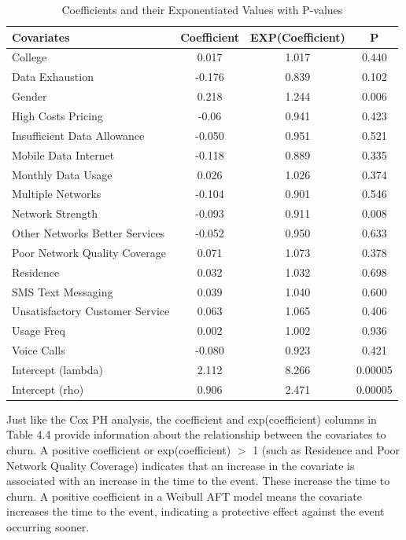 \documentclass[doublespacing]{report} %
\begin{document}
\begin{table}[H]
\centering
\begin{tabular}{lccc}
\toprule
\textbf{Covariates} & \textbf{Coefficient} & \textbf{EXP(Coefficient)} & \textbf{P} \\
\midrule
College & 0.017 & 1.017 & 0.440 \\
Data Exhaustion & -0.176 & 0.839 & 0.102 \\
Gender & 0.218 & 1.244 & 0.006 \\
High Costs Pricing & -0.06 & 0.941 & 0.423 \\
Insufficient Data Allowance & -0.050 & 0.951 & 0.521 \\
Mobile Data Internet & -0.118 & 0.889 & 0.335 \\
Monthly Data Usage & 0.026 & 1.026 & 0.374 \\
Multiple Networks & -0.104 & 0.901 & 0.546 \\
Network Strength & -0.093 & 0.911 & 0.008 \\
Other Networks Better Services & -0.052 & 0.950 & 0.633 \\
Poor Network Quality Coverage & 0.071 & 1.073 & 0.378 \\
Residence & 0.032 & 1.032 & 0.698 \\
SMS Text Messaging & 0.039 & 1.040 & 0.600 \\
Unsatisfactory Customer Service & 0.063 & 1.065 & 0.406 \\
Usage Freq & 0.002 & 1.002 & 0.936 \\
Voice Calls & -0.080 & 0.923 & 0.421 \\
Intercept (lambda) & 2.112 & 8.266 & 0.00005 \\
Intercept (rho) & 0.906 & 2.471 & 0.00005 \\
\bottomrule
\end{tabular}
\caption{Coefficients and their Exponentiated Values with P-values}
\end{table}

Just like the Cox PH analysis, the coefficient and exp(coefficient) columns in Table 4.4 provide information about the relationship between the covariates to churn. A positive coefficient or exp(coefficient) \(> \) 1 (such as Residence and Poor Network Quality Coverage) indicates that an increase in the covariate is associated with an increase in the time to the event. These increase the time to churn. A positive coefficient in a Weibull AFT model means the covariate increases the time to the event, indicating a protective effect against the event occurring sooner.
\end{document}
